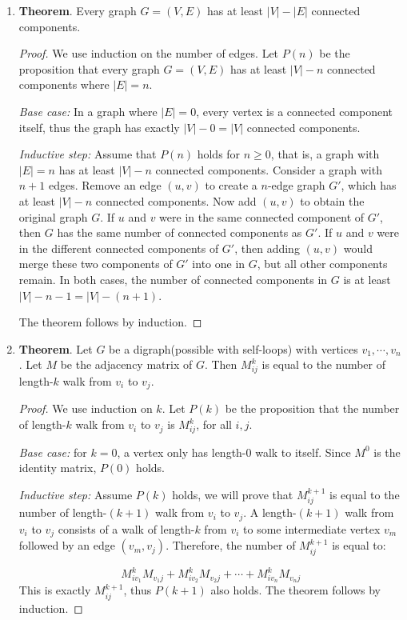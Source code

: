 \documentclass[11pt]{article}
\begin{document}
\begin{enumerate}
  \item 
    \textbf{Theorem}. Every graph $G=(V,E)$ has at least $|V|-|E|$
    connected components.
    \begin{proof}
      We use induction on the number of edges. Let $P(n)$ be the
      proposition that every graph $G=(V,E)$ has at least $|V|-n$
      connected components where $|E|=n$. 

      \emph{Base case:} In a graph where $|E|=0$, every vertex is a
      connected component itself, thus the graph has exactly
      $|V|-0=|V|$ connected components. 

      \emph{Inductive step:} Assume that $P(n)$ holds for $n \geq 0$,
      that is, a graph with $|E|=n$ has at least $|V|-n$ connected
      components. Consider a graph with $n+1$ edges. Remove an edge
      $(u,v)$ to create a $n$-edge graph $G'$, which has at least
      $|V|-n$ connected components. Now add $(u,v)$ to obtain the
      original graph $G$. If
      $u$ and $v$ were in the same connected component of $G'$, then
      $G$ has the same number of connected components as $G'$. If $u$
      and $v$ were in the different connected components of $G'$, then
      adding $(u,v)$ would merge these two components of $G'$ into one in
      $G$, but all other components remain. In both cases, the number
      of connected components in $G$ is at least $|V|-n-1=|V|-(n+1)$.

      The theorem follows by induction. 
    \end{proof}

  \item
    \textbf{Theorem}. Let $G$ be a digraph(possible with self-loops)
    with vertices $v_1, \cdots, v_n$. Let $M$ be the adjacency matrix
    of $G$. Then $M_{ij}^k$ is equal to the number of length-$k$ walk
    from $v_i$ to $v_j$.
    \begin{proof}
      We use induction on $k$. Let $P(k)$ be the proposition that the
      number of length-$k$ walk from $v_i$ to $v_j$ is $M_{ij}^k$, for
      all $i,j$. 

      \emph{Base case:} for $k=0$, a vertex only has length-$0$ walk
      to itself. Since $M^0$ is the identity matrix, $P(0)$ holds. 

      \emph{Inductive step:} Assume $P(k)$ holds, we will prove that
      $M_{ij}^{k+1}$ is equal to the number of length-$(k+1)$ walk
      from $v_i$ to $v_j$. A length-$(k+1)$ walk from $v_i$ to $v_j$
      consists of a walk of length-$k$ from $v_i$ to some intermediate
      vertex $v_m$ followed by an edge $(v_m, v_j)$. Therefore, the
      number of $M_{ij}^{k+1}$ is equal to:

      \begin{equation}
        M_{iv_1}^{k}M_{v_1j} + M_{iv_2}^{k}M_{v_2j} + \cdots +
        M_{iv_n}^{k}M_{v_nj} 
      \end{equation}
      This is exactly $M_{ij}^{k+1}$, thus $P(k+1)$ also holds. The
      theorem follows by induction.
    \end{proof}
\end{enumerate}
\end{document}
